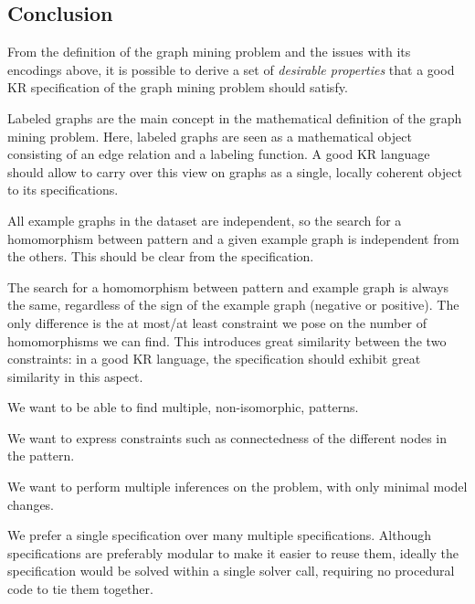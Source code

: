 \subsection{Conclusion}

From the definition of the graph mining problem and the issues with its encodings above, it is  possible to derive a set of \emph{desirable properties} that a good KR specification of the graph mining problem should satisfy.

\begin{compactitem}
\item Labeled graphs are the main concept in the mathematical definition of the graph mining problem. 
Here, labeled graphs are seen as a mathematical object consisting of an edge relation and a labeling function.
A good KR language should allow to carry over this view on graphs as a single, locally coherent object to its specifications. 
\item All example graphs in the dataset are independent, so the search for a homomorphism between pattern and a given example graph is independent from the others. This should be clear from the specification.
\item The search for a homomorphism between pattern and example graph is always the same, regardless of the sign of the example graph (negative or positive). The only difference is the at most/at least constraint we pose on the number of homomorphisms we can find.
This introduces great similarity between the two constraints: in a good KR language, the specification should exhibit great similarity in this aspect.
\item We want to be able to find multiple, non-isomorphic, patterns.
\item We want to express constraints such as connectedness of the different nodes in the pattern.
\item We want to perform multiple inferences on the problem, with only minimal model changes.
\item We prefer a single specification over many multiple specifications. 
Although specifications are preferably modular to make it easier to reuse them, ideally the specification would be solved within a single solver call, requiring no procedural code to tie them together.
\end{compactitem}

\def\checkmark{\tikz\fill[scale=0.4](0,.35) -- (.25,0) -- (1,.7) -- (.25,.15) -- cycle;} 

